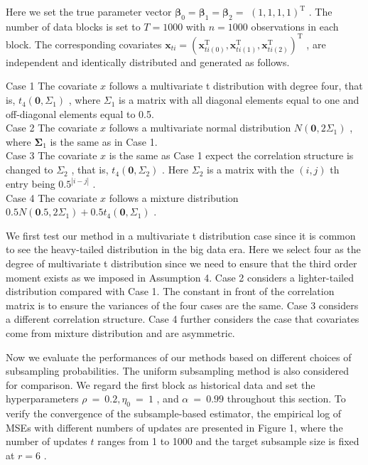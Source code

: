 Here we set the true parameter vector
\(\pmb { \beta } _ { 0 } = \pmb { \beta } _ { 1 } = \pmb { \beta } _ { 2 } =\)
\(( 1 , 1 , 1 , 1 ) ^ { \mathrm { T } }\) . The number of data blocks is
set to \(T = 1 0 0 0\) with \(n = 1 0 0 0\) observations in each block.
The corresponding covariates
\(\pmb { x } _ { t i } = ( \pmb { x } _ { t i ( 0 ) } ^ { \mathrm { T } } , \pmb { x } _ { t i ( 1 ) } ^ { \mathrm { T } } , \pmb { x } _ { t i ( 2 ) } ^ { \mathrm { T } } ) ^ { \mathrm { T } }\)
, are independent and identically distributed and generated as follows.

Case 1 The covariate \(x\) follows a multivariate t distribution with
degree four, that is, \(t _ { 4 } ( \mathbf { 0 } , \Sigma _ { 1 } )\) ,
where \(\Sigma _ { 1 }\) is a matrix with all diagonal elements equal to
one and off-diagonal elements equal to 0.5.\\
Case 2 The covariate \(x\) follows a multivariate normal distribution
\(N ( \mathbf { 0 } , 2 \Sigma _ { 1 } )\) , where
\({ \boldsymbol { \Sigma } } _ { 1 }\) is the same as in Case 1.\\
Case 3 The covariate \(x\) is the same as Case 1 expect the correlation
structure is changed to \(\Sigma _ { 2 }\) , that is,
\(t _ { 4 } ( \mathbf { 0 } , \Sigma _ { 2 } )\) . Here
\(\Sigma _ { 2 }\) is a matrix with the \(( i , j )\) th entry being
\(0 . 5 ^ { | i - j | }\) .\\
Case 4 The covariate \(x\) follows a mixture distribution
\(0 . 5 N ( \mathbf { 0 } . 5 , 2 \Sigma _ { 1 } ) + 0 . 5 t _ { 4 } ( \mathbf { 0 } , \Sigma _ { 1 } )\)
.

We first test our method in a multivariate t distribution case since it
is common to see the heavy-tailed distribution in the big data era. Here
we select four as the degree of multivariate t distribution since we
need to ensure that the third order moment exists as we imposed in
Assumption 4. Case 2 considers a lighter-tailed distribution compared
with Case 1. The constant in front of the correlation matrix is to
ensure the variances of the four cases are the same. Case 3 considers a
different correlation structure. Case 4 further considers the case that
covariates come from mixture distribution and are asymmetric.

Now we evaluate the performances of our methods based on different
choices of subsampling probabilities. The uniform subsampling method is
also considered for comparison. We regard the first block as historical
data and set the hyperparameters
\(\rho ~ = ~ 0 . 2 , \eta _ { 0 } ~ = ~ 1\) , and
\(\alpha \ = \ 0 . 9 9\) throughout this section. To verify the
convergence of the subsample-based estimator, the empirical log of MSEs
with different numbers of updates are presented in Figure 1, where the
number of updates \(t\) ranges from 1 to 1000 and the target subsample
size is fixed at \(r = 6\) .

